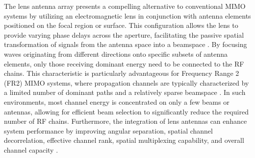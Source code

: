 

The lens antenna array presents a compelling alternative to conventional MIMO systems by utilizing an electromagnetic lens in conjunction with antenna elements positioned on the focal region or surface. This configuration allows the lens to provide varying phase delays across the aperture, facilitating the passive spatial transformation of signals from the antenna space into a beamspace \cite{Shen2019}. By focusing waves originating from different directions onto specific subsets of antenna elements, only those receiving dominant energy need to be connected to the RF chains. This characteristic is particularly advantageous for Frequency Range 2 (FR2) MIMO systems, where propagation channels are typically characterized by a limited number of dominant paths and a relatively sparse beamspace \cite{Zeng2016}. In such environments, most channel energy is concentrated on only a few beams or antennas, allowing for efficient beam selection to significantly reduce the required number of RF chains. Furthermore, the integration of lens antennas can enhance system performance by improving angular separation, spatial channel decorrelation, effective channel rank, spatial multiplexing capability, and overall channel capacity \cite{Zeng2016}.


